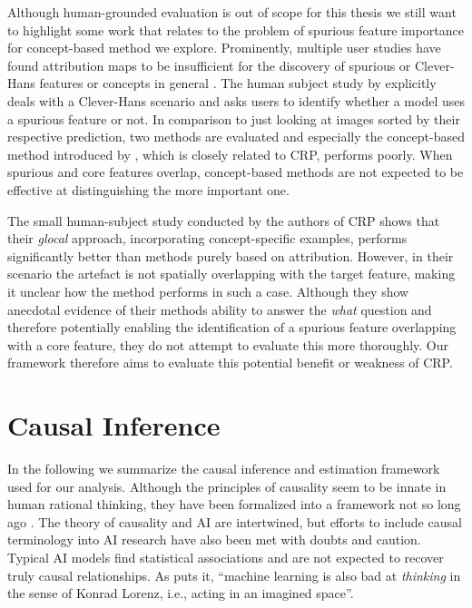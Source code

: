 Although human-grounded evaluation is out of scope for this thesis we still want to highlight some work that relates to the problem of spurious feature importance for concept-based method we explore. 
Prominently, multiple user studies have found attribution maps to be insufficient for the discovery of spurious or Clever-Hans features or concepts in general \citep{Sixt2022a,Rong2023,Kim2018}. 
The human subject study by \cite{Sixt2022a} explicitly deals with a Clever-Hans scenario and asks users to identify whether a model uses a spurious feature or not. In comparison to just looking at images sorted by their respective prediction, two methods are evaluated and especially the concept-based method introduced by \cite{Zhang2021}, which is closely related to CRP, performs poorly. When spurious and core features overlap, concept-based methods are not expected to be effective at distinguishing the more important one. 

The small human-subject study conducted by the authors of CRP \citep{Achtibat2023} shows that their \textit{glocal} approach, incorporating concept-specific examples, performs significantly better than methods purely based on attribution. However, in their scenario the artefact is not spatially overlapping with the target feature, making it unclear how the method performs in such a case. Although they show anecdotal evidence of their methods ability to answer the \textit{what} question and therefore potentially enabling the identification of a spurious feature overlapping with a core feature, they do not attempt to evaluate this more thoroughly. Our framework therefore aims to evaluate this potential benefit or weakness of CRP. 

\section{Causal Inference}\label{section:causal_inference_framework}
In the following we summarize the causal inference and estimation framework used for our analysis. 
Although the principles of causality seem to be innate in human rational thinking, they have been formalized into a framework not so long ago \citep{Spirtes1993, Halpern2005, Pearl2009, Peters2017}. The theory of causality and AI are intertwined, but efforts to include causal terminology into AI research have also been met with doubts and caution. Typical AI models find statistical associations and are not expected to recover truly causal relationships. As \citet{Schoelkopf2019} puts it, ``machine learning is also bad at \textit{thinking} in the sense of Konrad Lorenz, i.e., acting in an imagined space''.

